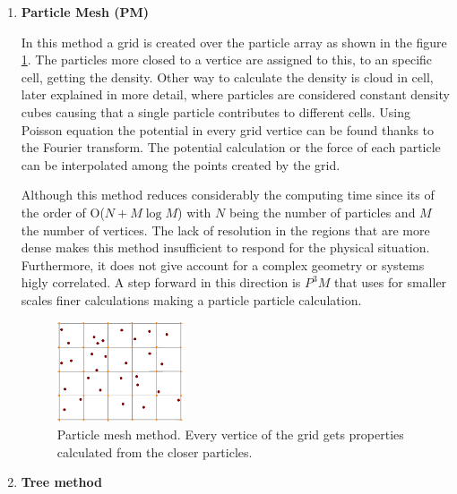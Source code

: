 \begin{enumerate}
\item \textbf{Particle Mesh (PM)}\cite{tree}

In this method a grid is created over the particle array
as shown in the figure \ref{PM}. The particles more closed
to a vertice are assigned to this, to an specific cell, getting the density. 
Other way to calculate the density is cloud in cell, later explained
in more detail, where particles are considered constant density cubes causing
that a single particle contributes to different cells.
Using Poisson equation the potential in every grid vertice can be found
thanks to the Fourier transform. The potential calculation or the force of 
each particle can be interpolated among the points created by the 
grid. 

Although this method reduces considerably the computing time 
since its of the order of O($N+M\log M$) with $N$ being the number of particles
and $M$ the number of vertices. The lack of resolution in the regions that are
more dense makes this method insufficient to respond for the physical situation.
Furthermore, it does not give account for a complex geometry or systems
higly correlated. A step forward in this direction is $P^3M$ that uses
for smaller scales finer calculations making a particle particle calculation. 

\begin{figure}[htbp]
       \centering
               \includegraphics[width=0.35\textwidth]{Images/chapter3/MG.png}
       \caption{\small Particle mesh method. Every vertice of the grid gets 
       properties calculated from the closer particles.}
       \label{PM}
 \end{figure}


\item \textbf{Tree method}\cite{tree}



\end{enumerate}
